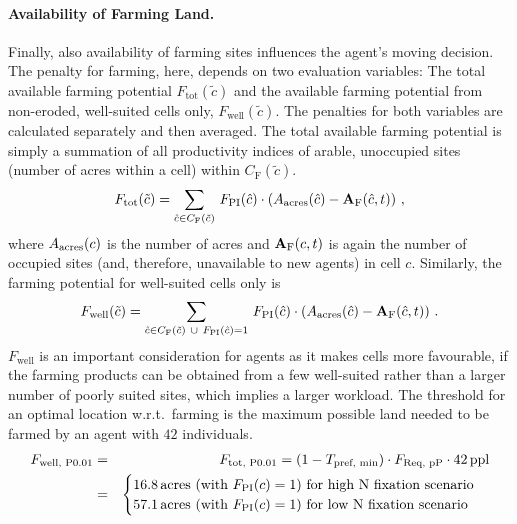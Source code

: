 \paragraph{Availability of Farming Land.}%
Finally, also availability of farming sites influences the agent's moving decision.
The penalty for farming, here, depends on two evaluation variables: 
The total available farming potential $F_\text{tot}(\tilde{c})$ and the available farming potential from non-eroded, well-suited cells only, $F_\text{well}(\tilde{c})$.
The penalties for both variables are calculated separately and then averaged.
The total available farming potential is simply a summation of all productivity indices of arable, unoccupied sites (number of acres within a cell) within $C_\text{F}(\tilde{c})$.
\begin{equation}
	F_\text{tot}(\tilde{c}) = \sum_{\hat{c} \in C_{\rm F}(\tilde{c}) }\, F_{\rm PI}(\hat{c}) \cdot (A_{\rm acres}(\hat{c})  - \mathbf{A}_{\rm F}(\hat{c}, t) ) \ ,
\end{equation}
where $A_{\rm acres}(c)$ is the number of acres and $ \mathbf{A}_{\rm F}(c,t)$ is again the number of occupied sites (and, therefore, unavailable to new agents) in cell $c$.
Similarly, the farming potential for well-suited cells only is 
\begin{equation}
	F_\text{well}(\tilde{c}) = \sum_{\hat{c} \in C_{\rm F}(\tilde{c}) \ \cup \ F_{\rm PI}(\hat{c})=1} \, F_{\rm PI}(\hat{c}) \cdot (A_{\rm acres}(\hat{c})  - \mathbf{A}_{\rm F}(\hat{c},t) ) \ .
\end{equation}
$F_\text{well}$ is an important consideration for agents as it makes cells more favourable, if the farming products can be obtained from a few well-suited rather than a larger number of poorly suited sites, which implies a larger workload.
The threshold for an optimal location w.r.t.\ farming is the maximum possible land needed to be farmed by an agent with $42$ individuals.
\begin{eqnarray}
F_\text{well, P0.01} & = & F_\text{tot, P0.01} =  (1-T_\text{pref, min})\cdot F_\text{Req, pP} \cdot 42\, {\rm ppl}  \\
& = & 
\begin{cases} 16.8\, {\rm acres}  \text{ (with }F_{\rm PI}(c)=1\text{) for high N fixation scenario} \\  57.1 \, {\rm acres} \text{ (with }F_{\rm PI}(c)=1\text{) for low N fixation scenario} \nonumber
\end{cases} 
\end{eqnarray}
